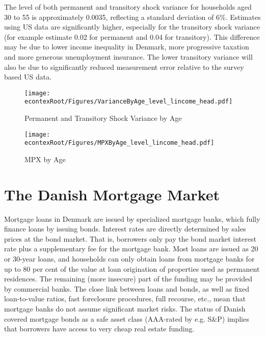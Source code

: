\documentclass[titlepage]{\econtex}\newcommand{\texname}{ConsumptionHeterogeneity}
\begin{document}
The level of both permanent and transitory shock variance for households aged 30 to 55 is approximately 0.0035, reflecting a standard deviation of 6\%. Estimates using US data are significantly higher, especially for the transitory shock variance (for example \cite{carroll_nature_1997} estimate 0.02 for permanent and 0.04 for transitory). This difference may be due to lower income inequality in Denmark, more progressive taxation and more generous unemployment insurance. The lower transitory variance will also be due to significantly reduced measurement error relative to the survey based US data. 
\begin{figure} 
	\begin{centering}
		\texttt{[image: \\econtexRoot/Figures/VarianceByAge\_level\_lincome\_head.pdf]} 
		\caption{Permanent and Transitory Shock Variance by Age}
		\label{fig:VarianceByAge}
	\end{centering}
\end{figure}
\begin{figure} 
	\begin{centering}
		\texttt{[image: \\econtexRoot/Figures/MPXByAge\_level\_lincome\_head.pdf]} 
		\caption{MPX by Age}
		\label{fig:MPXByAge}
	\end{centering}
\end{figure}

\section{The Danish Mortgage Market} \label{mortgage_market}
\setcounter{figure}{0}   
\setcounter{table}{0} 
Mortgage loans in Denmark are issued by specialized mortgage banks, which fully finance loans by issuing bonds. Interest rates are directly determined by sales prices at the bond market. That is, borrowers only pay the bond market interest rate plus a supplementary fee for the mortgage bank. 
Most loans are issued as 20 or 30-year loans, and households can only obtain loans from mortgage banks for up to 80 per cent of the value at loan origination of properties used as permanent residences. The remaining (more insecure) part of the funding may be provided by commercial banks. The close link between loans and bonds, as well as fixed loan-to-value ratios, fast foreclosure procedures, full recourse, etc., mean that mortgage banks do not assume significant market risks. The status of Danish covered mortgage bonds as a safe asset class (AAA-rated by e.g. S\&P) implies that borrowers have access to very cheap real estate funding.
\end{document}
